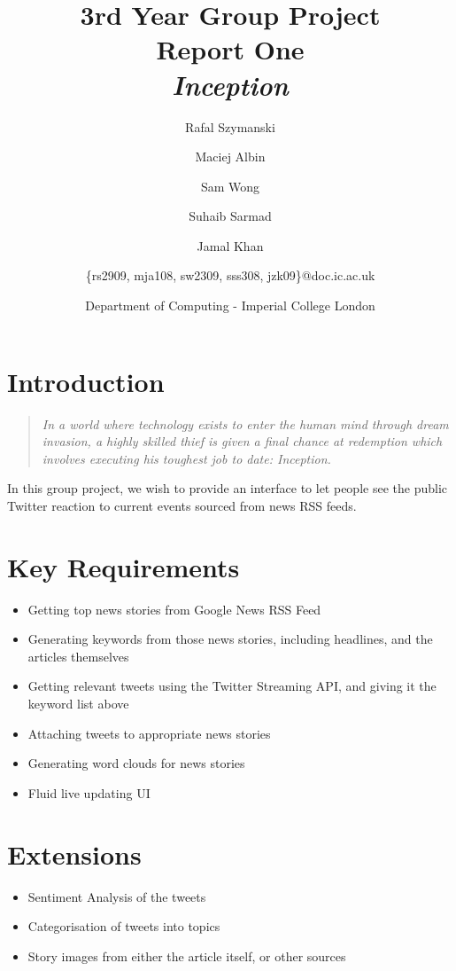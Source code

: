 \documentclass[a4paper,11pt]{article}
\title{3rd Year Group Project\\Report One\\\emph{Inception}}
\author{
    \small{Rafal Szymanski}\\
  	\and
    \small{Maciej Albin}\\
    \and
    \small{Sam Wong}\\
    \and
    \small{Suhaib Sarmad}\\
		\and
		\small{Jamal Khan}\\
		\and
		\small{\{rs2909, mja108, sw2309, sss308, jzk09\}@doc.ic.ac.uk}
		\and
		Department of Computing - Imperial College London
}
\begin{document}
 
	\maketitle
	
	\section{Introduction}
	
	\begin{quote}
\emph{In a world where technology exists to enter the human mind through dream invasion, a highly skilled thief is given a final chance at redemption which involves executing his toughest job to date: Inception.}	\end{quote}

	In this group project, we wish to provide an interface to let people see the public Twitter reaction to current events sourced from news RSS feeds.

	
	\section{Key Requirements}
		
		\begin{itemize}
			\item Getting top news stories from Google News RSS Feed
			\item Generating keywords from those news stories, including headlines, and the articles themselves
			\item Getting relevant tweets using the Twitter Streaming API, and giving it the keyword list above
			\item Attaching tweets to appropriate news stories
			\item Generating word clouds for news stories
			\item Fluid live updating UI
		\end{itemize}
		
	\section{Extensions}
	
		\begin{itemize}
			\item Sentiment Analysis of the tweets
			\item Categorisation of tweets into topics
			\item Story images from either the article itself, or other sources
		\end{itemize}
	
\end{document}
